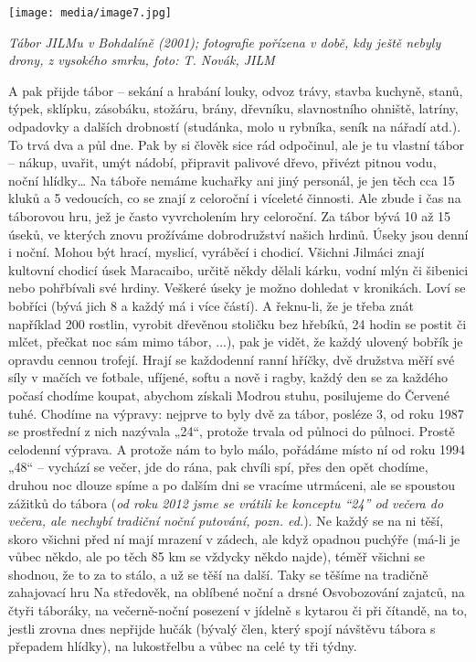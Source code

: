 \texttt{[image: media/image7.jpg]}

\emph{Tábor JILMu v Bohdalíně (2001); fotografie pořízena v době, kdy
ještě nebyly drony, z vysokého smrku, foto: T. Novák, JILM}

A pak přijde tábor -- sekání a hrabání louky, odvoz trávy, stavba
kuchyně, stanů, týpek, sklípku, zásobáku, stožáru, brány, dřevníku,
slavnostního ohniště, latríny, odpadovky a dalších drobností (studánka,
molo u rybníka, seník na nářadí atd.). To trvá dva a půl dne. Pak by si
člověk sice rád odpočinul, ale je tu vlastní tábor -- nákup, uvařit,
umýt nádobí, připravit palivové dřevo, přivézt pitnou vodu, noční
hlídky\ldots{} Na táboře nemáme kuchařky ani jiný personál, je jen těch
cca 15 kluků a 5 vedoucích, co se znají z celoroční i víceleté činnosti.
Ale zbude i čas na táborovou hru, jež je často vyvrcholením hry
celoroční. Za tábor bývá 10 až 15 úseků, ve kterých znovu prožíváme
dobrodružství našich hrdinů. Úseky jsou denní i noční. Mohou být hrací,
myslicí, vyráběcí i chodicí. Všichni Jilmáci znají kultovní chodicí úsek
Maracaibo, určitě někdy dělali kárku, vodní mlýn či šibenici nebo
pohřbívali své hrdiny. Veškeré úseky je možno dohledat v kronikách. Loví
se bobříci (bývá jich 8 a každý má i více částí). A řeknu-li, že je
třeba znát například 200 rostlin, vyrobit dřevěnou stoličku bez hřebíků,
24 hodin se postit či mlčet, přečkat noc sám mimo tábor, ...), pak je
vidět, že každý ulovený bobřík je opravdu cennou trofejí. Hrají se
každodenní ranní hříčky, dvě družstva měří své síly v mačích ve fotbale,
ufíjené, softu a nově i ragby, každý den se za každého počasí chodíme
koupat, abychom získali Modrou stuhu, posilujeme do Červené tuhé.
Chodíme na výpravy: nejprve to byly dvě za tábor, posléze 3, od roku
1987 se prostřední z nich nazývala „24``, protože trvala od půlnoci do
půlnoci. Prostě celodenní výprava. A protože nám to bylo málo, pořádáme
místo ní od roku 1994 „48`` -- vychází se večer, jde do rána, pak chvíli
spí, přes den opět chodíme, druhou noc dlouze spíme a po dalším dni se
vracíme utrmáceni, ale se spoustou zážitků do tábora (\emph{od roku 2012
jsme se vrátili ke konceptu ``24'' od večera do večera, ale nechybí
tradiční noční putování, pozn. ed.}). Ne každý se na ni těší, skoro
všichni před ní mají mrazení v zádech, ale když opadnou puchýře (má-li
je vůbec někdo, ale po těch 85 km se vždycky někdo najde), téměř všichni
se shodnou, že to za to stálo, a už se těší na další. Taky se těšíme na
tradičně zahajovací hru Na středověk, na oblíbené noční a drsné
Osvobozování zajatců, na čtyři táboráky, na večerně-noční posezení v
jídelně s kytarou či při čítandě, na to, jestli zrovna dnes nepřijde
hučák (bývalý člen, který spojí návštěvu tábora s přepadem hlídky), na
lukostřelbu a vůbec na celé ty tři týdny.

